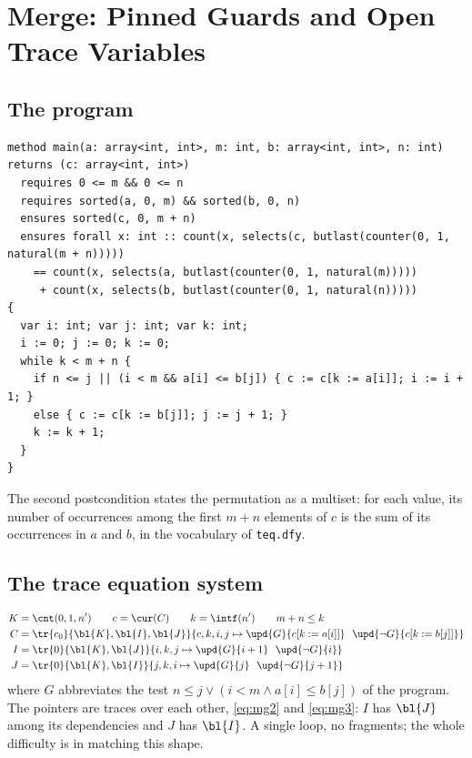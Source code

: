 \section{Merge: Pinned Guards and Open Trace Variables}\label{sec:merge}

\subsection{The program}
\begin{lstlisting}
method main(a: array<int, int>, m: int, b: array<int, int>, n: int) returns (c: array<int, int>)
  requires 0 <= m && 0 <= n
  requires sorted(a, 0, m) && sorted(b, 0, n)
  ensures sorted(c, 0, m + n)
  ensures forall x: int :: count(x, selects(c, butlast(counter(0, 1, natural(m + n)))))
    == count(x, selects(a, butlast(counter(0, 1, natural(m)))))
     + count(x, selects(b, butlast(counter(0, 1, natural(n)))))
{
  var i: int; var j: int; var k: int;
  i := 0; j := 0; k := 0;
  while k < m + n {
    if n <= j || (i < m && a[i] <= b[j]) { c := c[k := a[i]]; i := i + 1; }
    else { c := c[k := b[j]]; j := j + 1; }
    k := k + 1;
  }
}
\end{lstlisting}
The second postcondition states the permutation as a multiset: for each value, its number of occurrences
among the first $m + n$ elements of $c$ is the sum of its occurrences in $a$ and $b$, in the vocabulary of
\texttt{teq.dfy}.

\subsection{The trace equation system}
\begin{align}
  K &= \cnt(0, 1, n') \qquad c = \cur(C) \qquad k = \intf(n') \qquad m + n \le k \label{eq:mg0}\\
  C &= \tr{c_0}{\bl{K}, \bl{I}, \bl{J}}{c, k, i, j \mapsto \upd{G}{c[k := a[i]]}\ \ \upd{\neg G}{c[k := b[j]]}} \label{eq:mg1}\\
  I &= \tr{0}{\bl{K}, \bl{J}}{i, k, j \mapsto \upd{G}{i + 1}\ \ \upd{\neg G}{i}} \label{eq:mg2}\\
  J &= \tr{0}{\bl{K}, \bl{I}}{j, k, i \mapsto \upd{G}{j}\ \ \upd{\neg G}{j + 1}} \label{eq:mg3}
\end{align}
where $G$ abbreviates the test $n \le j \vee (i < m \wedge a[i] \le b[j])$ of the program. The pointers
are traces over each other, \eqref{eq:mg2} and \eqref{eq:mg3}: $I$ has $\bl{J}$ among its dependencies and $J$ has $\bl{I}$. A single loop,
no fragments; the whole difficulty is in matching this shape.

